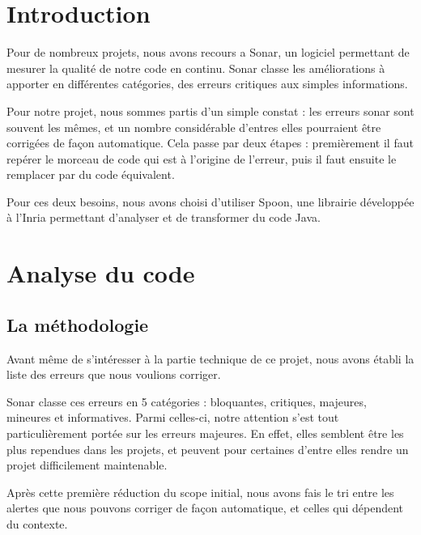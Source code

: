 \documentclass[a4paper]{article}
\begin{document}
\section{Introduction}
\par Pour de nombreux projets, nous avons recours a Sonar, un logiciel permettant de mesurer la qualité de notre code en continu. Sonar classe les améliorations à apporter en différentes catégories, des erreurs critiques aux simples informations.
\\
\par Pour notre projet, nous sommes partis d'un simple constat : les erreurs sonar sont souvent les mêmes, et un nombre considérable d'entres elles pourraient être corrigées de façon automatique. Cela passe par deux étapes : premièrement il faut repérer le morceau de code qui est à l'origine de l'erreur, puis il faut ensuite le remplacer par du code équivalent.
\\
\par Pour ces deux besoins, nous avons choisi d'utiliser Spoon, une librairie développée à l'Inria permettant d'analyser et de transformer du code Java.

\newpage
\section{Analyse du code}
\subsection{La méthodologie}
\par Avant même de s'intéresser à la partie technique de ce projet, nous avons établi la liste des erreurs que nous voulions corriger.
\\
\par Sonar classe ces erreurs en 5 catégories : bloquantes, critiques, majeures, mineures et informatives. Parmi celles-ci, notre attention s'est tout particulièrement portée sur les erreurs majeures. En effet, elles semblent être les plus rependues dans les projets, et peuvent pour certaines d'entre elles rendre un projet difficilement maintenable.
\\
\par Après cette première réduction du scope initial, nous avons fais le tri entre les alertes que nous pouvons corriger de façon automatique, et celles qui dépendent du contexte. 
\end{document}
